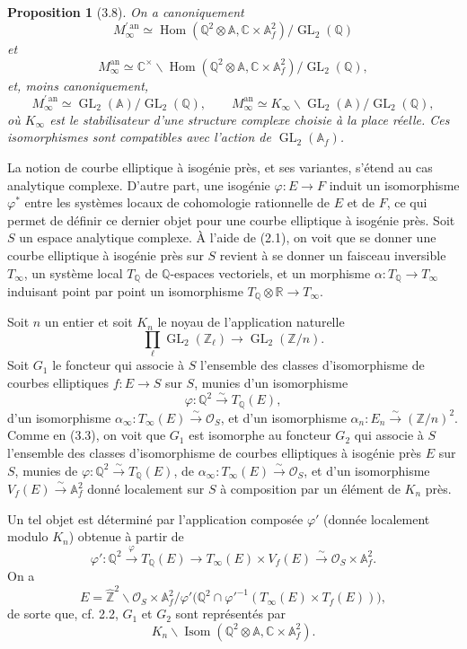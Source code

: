 \documentclass[10pt]{article}
\newcommand{\A}{\mathbb A}
\newcommand{\Af}{\mathbb A_f}
\newcommand{\C}{\mathbb C}
\newcommand{\Q}{\mathbb Q}
\newcommand{\R}{\mathbb R}
\newcommand{\Z}{\mathbb Z}
\newcommand{\bZ}{\widehat{\mathbb Z}}
\newcommand{\GL}{\operatorname{GL}}
\newcommand{\Hom}{\operatorname{Hom}}
\newcommand{\Isom}{\operatorname{Isom}}
\newcommand{\cO}{\mathcal O}
\newcommand{\an}{\mathrm{an}}
\newtheorem*{proposition}{Proposition}
\begin{document}
\begin{proposition}[3.8]
On a canoniquement
\[
M_\infty^{\prime\,\an}\simeq
\Hom(\Q^2\otimes\A,\C\times\Af^2)/\GL_2(\Q)
\]
et
\[
M_\infty^{\an}\simeq
\C^\times\backslash\Hom(\Q^2\otimes\A,\C\times\Af^2)/\GL_2(\Q),
\]
et, moins canoniquement,
\[
M_\infty^{\prime\,\an}\simeq \GL_2(\A)/\GL_2(\Q),\qquad
M_\infty^{\an}\simeq K_\infty\backslash \GL_2(\A)/\GL_2(\Q),
\]
où $K_\infty$ est le stabilisateur d'une structure complexe choisie à la place réelle. Ces
isomorphismes sont compatibles avec l'action de $\GL_2(\Af)$.
\end{proposition}

La notion de courbe elliptique à isogénie près, et ses variantes, s'étend au cas analytique
complexe. D'autre part, une isogénie $\varphi:E\to F$ induit un isomorphisme $\varphi^*$
entre les systèmes locaux de cohomologie rationnelle de $E$ et de $F$, ce qui permet de
définir ce dernier objet pour une courbe elliptique à isogénie près. Soit $S$ un espace
analytique complexe. À l'aide de (2.1), on voit que se donner une courbe elliptique à
isogénie près sur $S$ revient à se donner un faisceau inversible $T_\infty$, un système local
$T_\Q$ de $\Q$-espaces vectoriels, et un morphisme $\alpha:T_\Q\to T_\infty$ induisant
point par point un isomorphisme $T_\Q\otimes\R\to T_\infty$.

Soit $n$ un entier et soit $K_n$ le noyau de l'application naturelle
\[
\prod_\ell \GL_2(\Z_\ell)\to \GL_2(\Z/n).
\]
Soit $G_1$ le foncteur qui associe à $S$ l'ensemble des classes d'isomorphisme de courbes
elliptiques $f:E\to S$ sur $S$, munies d'un isomorphisme
\[
\varphi:\Q^2\xrightarrow{\sim}T_\Q(E),
\]
d'un isomorphisme $\alpha_\infty:T_\infty(E)\xrightarrow{\sim}\cO_S$, et d'un isomorphisme
$\alpha_n:E_n\xrightarrow{\sim}(\Z/n)^2$. Comme en (3.3), on voit que $G_1$ est
isomorphe au foncteur $G_2$ qui associe à $S$ l'ensemble des classes d'isomorphisme de
courbes elliptiques à isogénie près $E$ sur $S$, munies de
$\varphi:\Q^2\xrightarrow{\sim}T_\Q(E)$, de
$\alpha_\infty:T_\infty(E)\xrightarrow{\sim}\cO_S$, et d'un isomorphisme
$V_f(E)\xrightarrow{\sim}\Af^2$ donné localement sur $S$ à composition par un élément de
$K_n$ près.

Un tel objet est déterminé par l'application composée $\varphi'$ (donnée localement modulo
$K_n$) obtenue à partir de
\[
\varphi':\Q^2\xrightarrow{\varphi}T_\Q(E)
\longrightarrow T_\infty(E)\times V_f(E)
\xrightarrow{\sim}\cO_S\times \Af^2.
\]
On a
\[
E=\bZ^2\backslash \cO_S\times \Af^2/
\varphi'\bigl(\Q^2\cap \varphi'^{-1}(T_\infty(E)\times T_f(E))\bigr),
\]
de sorte que, cf. 2.2, $G_1$ et $G_2$ sont représentés par
\[
K_n\backslash\Isom(\Q^2\otimes\A,\C\times\Af^2).
\]
\end{document}
